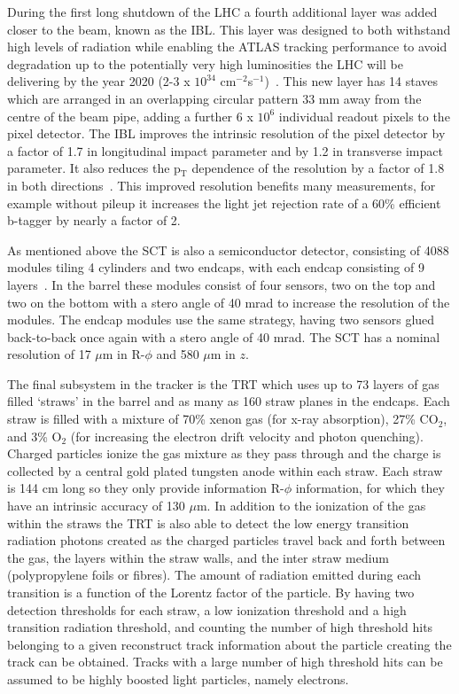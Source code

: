 During the first long shutdown of the LHC a fourth additional layer was added closer to the beam, known as the \gls{IBL}.  
This layer was designed to both withstand high levels of radiation while enabling the ATLAS tracking performance to avoid degradation up to the potentially very high luminosities the LHC will be delivering by the year 2020 (2-3 x $10^{34}$ cm$^{-2}$s$^{-1}$)~\cite{IBL1}.  
This new layer has 14 staves which are arranged in an overlapping circular pattern 33 mm away from the centre of the beam pipe, adding a further 6 x $10^{6}$ individual readout pixels to the pixel detector.  
The IBL improves the intrinsic resolution of the pixel detector by a factor of 1.7 in longitudinal impact parameter and by 1.2 in transverse impact parameter.  
It also reduces the p$_{\mathrm{T}}$ dependence of the resolution by a factor of 1.8 in both directions~\cite{IBL2}.  
This improved resolution benefits many measurements, for example without pileup it increases the light jet rejection rate of a 60\% efficient b-tagger by nearly a factor of 2.  

As mentioned above the \gls{SCT} is also a semiconductor detector, consisting of 4088 modules tiling 4 cylinders and two endcaps, with each endcap consisting of 9 layers~\cite{JOIATLAS}.  
In the barrel these modules consist of four sensors, two on the top and two on the bottom with a stero angle of 40 mrad to increase the resolution of the modules.  
The endcap modules use the same strategy, having two sensors glued back-to-back once again with a stero angle of 40 mrad.  
The SCT has a nominal resolution of 17 $\mu$m in R-$\phi$ and 580 $\mu$m in $z$.  

The final subsystem in the tracker is the TRT which uses up to 73 layers of gas filled `straws' in the barrel and as many as 160 straw planes in the endcaps.  
Each straw is filled with a mixture of 70\% xenon gas (for x-ray absorption), 27\% CO$_{2}$, and 3\% O$_{2}$ (for increasing the electron drift velocity and photon quenching).  
Charged particles ionize the gas mixture as they pass through and the charge is collected by a central gold plated tungsten anode within each straw.  
Each straw is 144 cm long so they only provide information R-$\phi$ information, for which they have an intrinsic accuracy of 130 $\mu$m.  
In addition to the ionization of the gas within the straws the TRT is also able to detect the low energy transition radiation photons created as the charged particles travel back and forth between the gas, the layers within the straw walls, and the inter straw medium (polypropylene foils or fibres).  
The amount of radiation emitted during each transition is a function of the Lorentz factor of the particle.  
By having two detection thresholds for each straw, a low ionization threshold and a high transition radiation threshold, and counting the number of high threshold hits belonging to a given reconstruct track information about the particle creating the track can be obtained.  
Tracks with a large number of high threshold hits can be assumed to be highly boosted light particles, namely electrons.  

